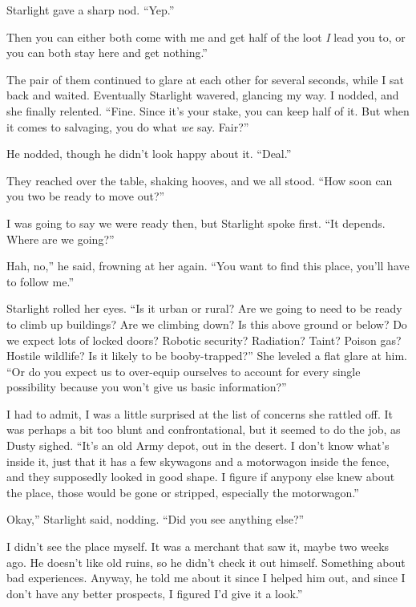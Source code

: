 Starlight gave a sharp nod. “Yep.”

\leavevmode{}Then you can either both come with me and get half of the loot \textit{I} lead you to, or you can both stay here and get nothing.”

The pair of them continued to glare at each other for several seconds, while I sat back and waited. Eventually Starlight wavered, glancing my way. I nodded, and she finally relented. “Fine. Since it’s your stake, you can keep half of it. But when it comes to salvaging, you do what \textit{we} say. Fair?”

He nodded, though he didn’t look happy about it. “Deal.”

They reached over the table, shaking hooves, and we all stood. “How soon can you two be ready to move out?”

I was going to say we were ready then, but Starlight spoke first. “It depends. Where are we going?”

\leavevmode{}Hah, no,” he said, frowning at her again. “You want to find this place, you’ll have to follow me.”

Starlight rolled her eyes. “Is it urban or rural? Are we going to need to be ready to climb up buildings? Are we climbing down? Is this above ground or below? Do we expect lots of locked doors? Robotic security? Radiation? Taint? Poison gas? Hostile wildlife? Is it likely to be booby-trapped?” She leveled a flat glare at him. “Or do you expect us to over-equip ourselves to account for every single possibility because you won’t give us basic information?”

I had to admit, I was a little surprised at the list of concerns she rattled off. It was perhaps a bit too blunt and confrontational, but it seemed to do the job, as Dusty sighed. “It’s an old Army depot, out in the desert. I don’t know what’s inside it, just that it has a few skywagons and a motorwagon inside the fence, and they supposedly looked in good shape. I figure if anypony else knew about the place, those would be gone or stripped, especially the motorwagon.”

\leavevmode{}Okay,” Starlight said, nodding. “Did you see anything else?”

\leavevmode{}I didn’t see the place myself. It was a merchant that saw it, maybe two weeks ago. He doesn’t like old ruins, so he didn’t check it out himself. Something about bad experiences. Anyway, he told me about it since I helped him out, and since I don’t have any better prospects, I figured I’d give it a look.”

